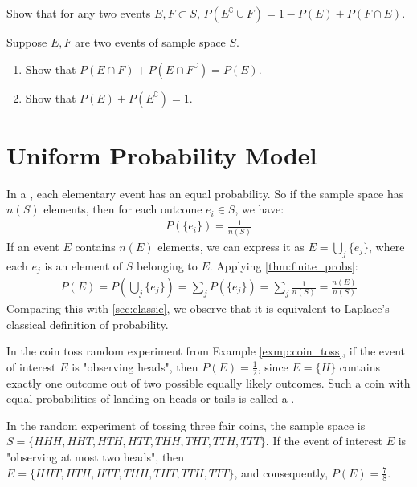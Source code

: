 \begin{ex}
	Show that for any two events \( E, F \subset S \), \( P(E^\complement \cup F) = 1 - P(E) + P(F \cap E) \).
\end{ex}
\begin{ex}\label{ex:marginal_probs}
	Suppose \( E, F \) are two events of sample space \( S \).
	\begin{enumerate}
		\item Show that \( P(E \cap F) + P(E \cap F^\complement) = P(E) \).
		\item Show that \( P(E) + P(E^\complement) = 1 \).
	\end{enumerate}
\end{ex}

\section{Uniform Probability Model}

In a , each elementary event has an equal probability.
So if the sample space has \( n(S) \) elements, then for each outcome \( e_i \in S \), we have:
\begin{align*}
	P(\{e_i\}) = \frac{1}{n(S)}
\end{align*}
If an event \( E \) contains \( n(E) \) elements,
we can express it as \( E = \bigcup_{j} \{e_j\} \), where each \( e_j \) is an element of \( S \) belonging to \( E \).
Applying \autoref{thm:finite_probs}:
\begin{align*}
	P(E) = P(\bigcup_{j} \{e_j\}) = \sum_{j} P(\{e_j\}) = \sum_{j} \frac{1}{n(S)} = \frac{n(E)}{n(S)}
\end{align*}
Comparing this with \autoref{sec:classic}, we observe that it is equivalent to Laplace's classical definition of probability.

\begin{exmp}
	In the coin toss random experiment from Example \autoref{exmp:coin_toss}, if the event of interest \( E \) is "observing heads",
	then \( P(E) = \frac{1}{2} \), since \( E = \{ H \} \) contains exactly one outcome out of two possible equally likely outcomes.
	Such a coin with equal probabilities of landing on heads or tails is called a .
\end{exmp}

\begin{exmp}\label{exmp:three_fair_coins}
	In the random experiment of tossing three fair coins, the sample space is
	\( S = \{ HHH, HHT, HTH, HTT, THH, THT, TTH, TTT \} \).
	If the event of interest \( E \) is "observing at most two heads",
	then \( E = \{ HHT, HTH, HTT, THH, THT, TTH, TTT \} \), and consequently, \( P(E) = \frac{7}{8} \).
\end{exmp}

